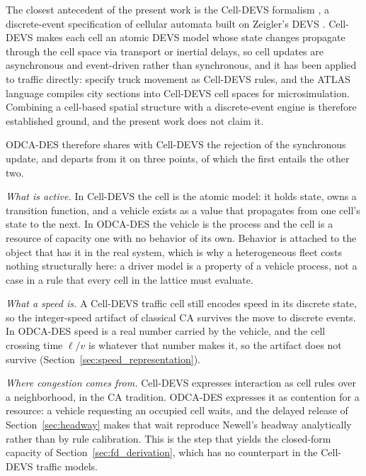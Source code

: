 \documentclass[review,number]{elsarticle}
\begin{document}
The closest antecedent of the present work is the Cell-DEVS formalism \citep{wainer2001timed,wainer2014cellular}, a discrete-event specification of cellular automata built on Zeigler's DEVS \citep{zeigler2000theory}. Cell-DEVS makes each cell an atomic DEVS model whose state changes propagate through the cell space via transport or inertial delays, so cell updates are asynchronous and event-driven rather than synchronous, and it has been applied to traffic directly: \citet{davidson2000specifying} specify truck movement as Cell-DEVS rules, and the ATLAS language \citep{wainer2006atlas} compiles city sections into Cell-DEVS cell spaces for microsimulation. Combining a cell-based spatial structure with a discrete-event engine is therefore established ground, and the present work does not claim it.

ODCA-DES therefore shares with Cell-DEVS the rejection of the synchronous update, and departs from it on three points, of which the first entails the other two.

\emph{What is active.} In Cell-DEVS the cell is the atomic model: it holds state, owns a transition function, and a vehicle exists as a value that propagates from one cell's state to the next. In ODCA-DES the vehicle is the process and the cell is a resource of capacity one with no behavior of its own. Behavior is attached to the object that has it in the real system, which is why a heterogeneous fleet costs nothing structurally here: a driver model is a property of a vehicle process, not a case in a rule that every cell in the lattice must evaluate.

\emph{What a speed is.} A Cell-DEVS traffic cell still encodes speed in its discrete state, so the integer-speed artifact of classical CA survives the move to discrete events. In ODCA-DES speed is a real number carried by the vehicle, and the cell crossing time $\ell/v$ is whatever that number makes it, so the artifact does not survive (Section~\ref{sec:speed_representation}).

\emph{Where congestion comes from.} Cell-DEVS expresses interaction as cell rules over a neighborhood, in the CA tradition. ODCA-DES expresses it as contention for a resource: a vehicle requesting an occupied cell waits, and the delayed release of Section~\ref{sec:headway} makes that wait reproduce Newell's headway analytically rather than by rule calibration. This is the step that yields the closed-form capacity of Section~\ref{sec:fd_derivation}, which has no counterpart in the Cell-DEVS traffic models.
\end{document}
